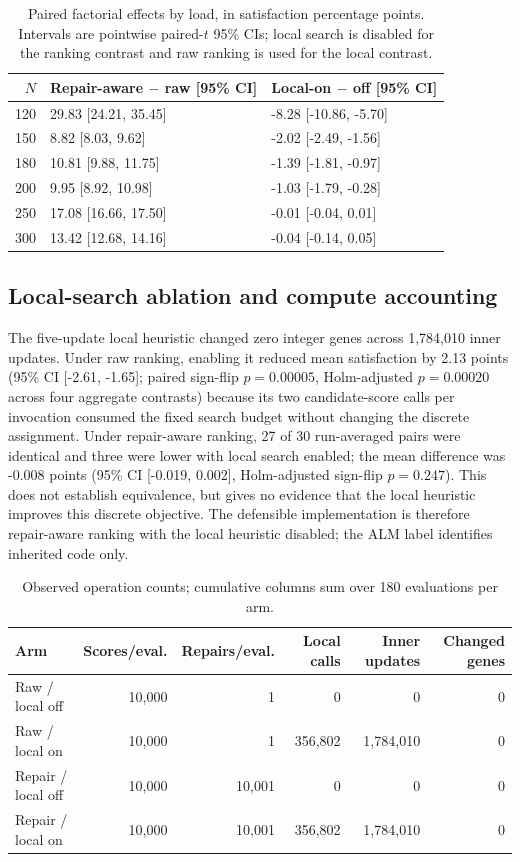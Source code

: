 \documentclass[pdflatex,sn-mathphys-num]{sn-jnl}
\begin{document}
\begin{table}[t]
\caption{Paired factorial effects by load, in satisfaction percentage points. Intervals are pointwise paired-$t$ 95\% CIs; local search is disabled for the ranking contrast and raw ranking is used for the local contrast.}
\label{tab:strict-v2-effects}
\centering\small
\setlength{\tabcolsep}{4pt}
\begin{tabular}{rll}
\toprule
$N$ & Repair-aware $-$ raw [95\% CI] & Local-on $-$ off [95\% CI] \\
\midrule
120 & 29.83 [24.21, 35.45] & -8.28 [-10.86, -5.70] \\
150 & 8.82 [8.03, 9.62] & -2.02 [-2.49, -1.56] \\
180 & 10.81 [9.88, 11.75] & -1.39 [-1.81, -0.97] \\
200 & 9.95 [8.92, 10.98] & -1.03 [-1.79, -0.28] \\
250 & 17.08 [16.66, 17.50] & -0.01 [-0.04, 0.01] \\
300 & 13.42 [12.68, 14.16] & -0.04 [-0.14, 0.05] \\
\bottomrule
\end{tabular}
\end{table}

\subsection{Local-search ablation and compute accounting}
The five-update local heuristic changed zero integer genes across 1,784,010 inner updates. Under raw ranking, enabling it reduced mean satisfaction by 2.13 points (95\% CI [-2.61, -1.65]; paired sign-flip $p=0.00005$, Holm-adjusted $p=0.00020$ across four aggregate contrasts) because its two candidate-score calls per invocation consumed the fixed search budget without changing the discrete assignment. Under repair-aware ranking, 27 of 30 run-averaged pairs were identical and three were lower with local search enabled; the mean difference was -0.008 points (95\% CI [-0.019, 0.002], Holm-adjusted sign-flip $p=0.247$). This does not establish equivalence, but gives no evidence that the local heuristic improves this discrete objective. The defensible implementation is therefore repair-aware ranking with the local heuristic disabled; the ALM label identifies inherited code only.

\begin{table}[t]
\caption{Observed operation counts; cumulative columns sum over 180 evaluations per arm.}
\label{tab:strict-v2-budget}
\centering\scriptsize
\setlength{\tabcolsep}{2pt}
\begin{tabular}{lrrrrr}
\toprule
Arm & Scores/eval. & Repairs/eval. & Local calls & Inner updates & Changed genes \\
\midrule
Raw / local off & 10,000 & 1 & 0 & 0 & 0 \\
Raw / local on & 10,000 & 1 & 356,802 & 1,784,010 & 0 \\
Repair / local off & 10,000 & 10,001 & 0 & 0 & 0 \\
Repair / local on & 10,000 & 10,001 & 356,802 & 1,784,010 & 0 \\
\bottomrule
\end{tabular}
\end{table}
\end{document}
